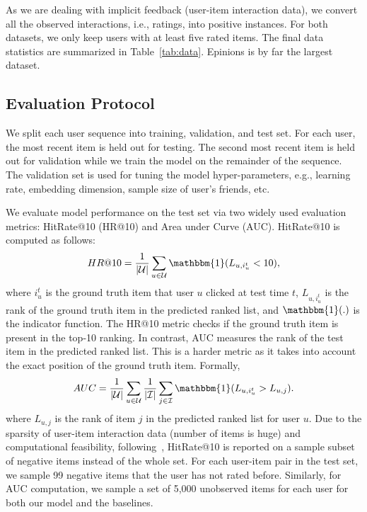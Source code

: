 As we are dealing with implicit feedback (user-item interaction data), we convert all the observed interactions, i.e., ratings, into positive instances. For both datasets, we only keep users with at least five rated items. The final data statistics are summarized in Table~\ref{tab:data}. Epinions is by far the largest dataset.

\subsection{Evaluation Protocol}
We split each user sequence into training, validation, and test set. For each user, the most recent item is held out for testing. The second most recent item is held out for validation while we train the model on the remainder of the sequence. The validation set is used for tuning the model hyper-parameters, e.g., learning rate, embedding dimension, sample size of user's friends, etc. %

We evaluate model performance on the test set via two widely used evaluation metrics:  HitRate@10 (HR@10) and Area under Curve (AUC). HitRate@10 is computed as follows:
\begin{align}
  HR@10 = \frac{1}{\vert {\mathcal U} \vert} \sum_{u \in {\mathcal U}} \mathbbm{1}  (L_{u,i_u^{t}} < 10),
\end{align}
where $i_u^{t}$ is the ground truth item that user $u$ clicked at test time $t$, $L_{u,i_u^{t}}$ is the rank of the ground truth item in the predicted ranked list, and  $\mathbbm{1}(.)$ is the indicator function. The HR@10 metric checks if the ground truth item is present in the top-10 ranking.
In contrast, AUC measures the rank of the test item in the predicted ranked list. This is a harder metric as it takes into account  the exact position of the ground truth item. Formally,
\begin{align}
AUC = \frac{1}{\vert {\mathcal U} \vert} \sum_{u \in {\mathcal U}} \frac{1}{\vert {\mathcal I} \vert} \sum_{j \in {\mathcal I}} \mathbbm{1} (L_{u, i_u^{t}} > L_{u,j}).
\end{align}
where $L_{u,j}$ is the rank of item $j$ in the predicted ranked list for user $u$.
Due to the sparsity of user-item interaction data (number of items is huge) and computational feasibility, following~\cite{He:2016}, HitRate@10 is reported on a sample subset of negative items instead of the whole set. For each user-item pair in the test set, we sample 99 negative items that the user has not rated before.  Similarly, for AUC computation, we sample a set of 5,000 unobserved items for each user for both our model and the baselines.

